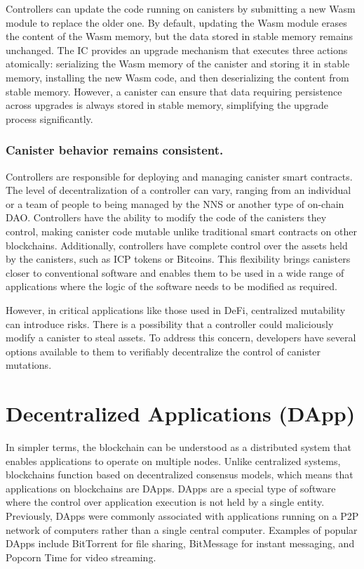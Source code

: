Controllers can update the code running on canisters by submitting a new \ac{Wasm} module to replace the older one. By default, updating the \ac{Wasm} module erases the content of the \ac{Wasm} memory, but the data stored in stable memory remains unchanged. The \ac{IC} provides an upgrade mechanism that executes three actions atomically: serializing the \ac{Wasm} memory of the canister and storing it in stable memory, installing the new \ac{Wasm} code, and then deserializing the content from stable memory. However, a canister can ensure that data requiring persistence across upgrades is always stored in stable memory, simplifying the upgrade process significantly.

\subsubsection{Canister behavior remains consistent.}
Controllers are responsible for deploying and managing canister smart contracts. The level of decentralization of a controller can vary, ranging from an individual or a team of people to being managed by the \ac{NNS} \cite{InternetComputerNNS} or another type of on-chain \ac{DAO}. Controllers have the ability to modify the code of the canisters they control, making canister code mutable unlike traditional smart contracts on other blockchains. Additionally, controllers have complete control over the assets held by the canisters, such as ICP tokens or Bitcoins. This flexibility brings canisters closer to conventional software and enables them to be used in a wide range of applications where the logic of the software needs to be modified as required.

However, in critical applications like those used in \ac{DeFi}, centralized mutability can introduce risks. There is a possibility that a controller could maliciously modify a canister to steal assets. To address this concern, developers have several options available to them to verifiably decentralize the control of canister mutations.

\section{Decentralized Applications (DApp)}

In simpler terms, the blockchain can be understood as a distributed system that enables applications to operate on multiple nodes. Unlike centralized systems, blockchains function based on decentralized consensus models, which means that applications on blockchains are \ac{DApps}. \ac{DApps} are a special type of software where the control over application execution is not held by a single entity. Previously, \ac{DApps} were commonly associated with applications running on a \ac{P2P} network of computers rather than a single central computer. Examples of popular \ac{DApps} include BitTorrent for file sharing, BitMessage for instant messaging, and Popcorn Time for video streaming.

